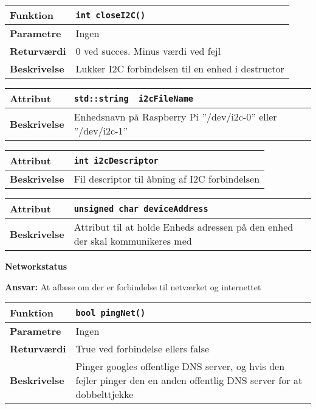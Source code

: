 \begin{center}
    \begin{tabular}{ | l | p{} |}
    \hline
    \textbf{Funktion}	& \verb+int closeI2C() +\\ \hline
    \textbf{Parametre} 	& Ingen \\ \hline
    \textbf{Returværdi}	& 0 ved succes. Minus værdi ved fejl \\ \hline
    \textbf{Beskrivelse}	& Lukker I2C forbindelsen til en enhed i destructor\\ \hline
    \end{tabular}
\end{center}

\begin{center}
    \begin{tabular}{ | l | p{} |}
    \hline
    \textbf{Attribut}	& \verb+std::string  i2cFileName +\\ \hline
    \textbf{Beskrivelse}	& Enhedsnavn på Raspberry Pi ''/dev/i2c-0'' eller ''/dev/i2c-1''\\ \hline
    \end{tabular}
\end{center}

\begin{center}
    \begin{tabular}{ | l | p{} |}
    \hline
    \textbf{Attribut}	& \verb+int i2cDescriptor + \\ \hline
    \textbf{Beskrivelse}	& Fil descriptor til åbning af I2C forbindelsen \\ \hline
    \end{tabular}
\end{center}

\begin{center}
    \begin{tabular}{ | l | p{} |}
    \hline
    \textbf{Attribut}	& \verb+unsigned char deviceAddress + \\ \hline
    \textbf{Beskrivelse}	& Attribut til at holde Enheds adressen på den enhed der skal kommunikeres med \\ \hline
    \end{tabular}
\end{center}

{\centering
\textbf{Networkstatus}\par
}
\textbf{Ansvar:} At aflæse om der er forbindelse til netværket og internettet \

\begin{center}
    \begin{tabular}{ | l | p{} |}
    \hline
    \textbf{Funktion}	& \verb+bool pingNet() +\\ \hline
    \textbf{Parametre} 	& Ingen \\ \hline
    \textbf{Returværdi}	& True ved forbindelse ellers false \\ \hline
    \textbf{Beskrivelse}	& Pinger googles offentlige DNS server, og hvis den fejler pinger den en anden offentlig DNS server for at dobbelttjekke\\ \hline
    \end{tabular}
\end{center}

